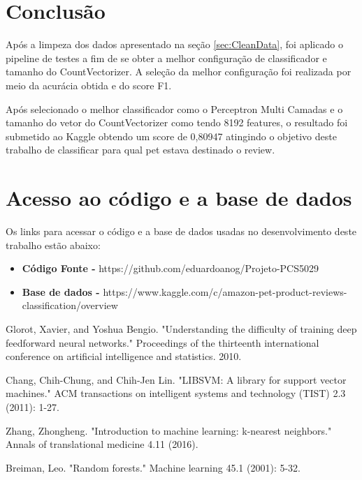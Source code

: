 \documentclass[conference]{IEEEtran}
\begin{document}
\section{Conclusão}

Após a limpeza dos dados apresentado na seção \ref{sec:CleanData}, foi aplicado o pipeline de testes a fim de se obter a melhor configuração de classificador e tamanho do CountVectorizer. A seleção da melhor configuração foi realizada por meio da acurácia obtida e do score F1.

Após selecionado o melhor classificador como o Perceptron Multi Camadas e o tamanho do vetor do CountVectorizer como tendo 8192 features, o resultado foi submetido ao Kaggle obtendo um score de 0,80947 atingindo o objetivo deste trabalho de classificar para qual pet estava destinado o review.

	
\section{Acesso ao código e a base de dados}

Os links para acessar o código e a base de dados usadas no desenvolvimento deste trabalho estão abaixo:

\begin{itemize}
	\item \textbf{Código Fonte - } https://github.com/eduardoanog/Projeto-PCS5029
	\item \textbf{Base de dados - } https://www.kaggle.com/c/amazon-pet-product-reviews-classification/overview
\end{itemize}


\begin{thebibliography}{00}
 Glorot, Xavier, and Yoshua Bengio. "Understanding the difficulty of training deep feedforward neural networks." Proceedings of the thirteenth international conference on artificial intelligence and statistics. 2010.

 Chang, Chih-Chung, and Chih-Jen Lin. "LIBSVM: A library for support vector machines." ACM transactions on intelligent systems and technology (TIST) 2.3 (2011): 1-27.

 Zhang, Zhongheng. "Introduction to machine learning: k-nearest neighbors." Annals of translational medicine 4.11 (2016).

 Breiman, Leo. "Random forests." Machine learning 45.1 (2001): 5-32.
\end{thebibliography}
\end{document}
